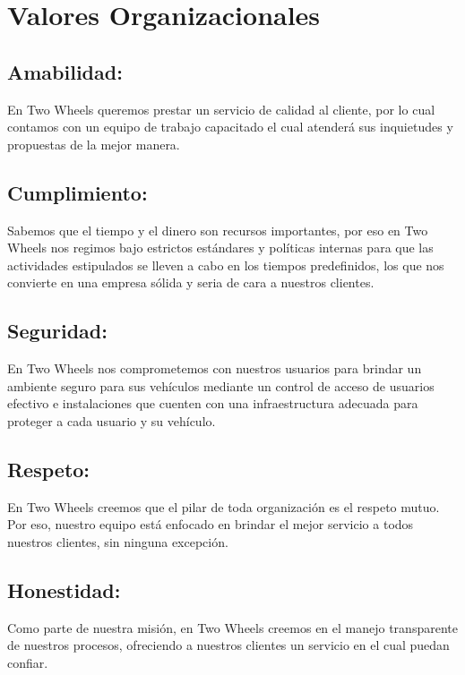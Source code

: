 \section{Valores Organizacionales}
\subsection{Amabilidad:}  En Two Wheels queremos prestar un servicio de calidad al cliente, por lo cual contamos con un equipo de trabajo capacitado el cual atenderá sus inquietudes y propuestas de la mejor manera.
\subsection{Cumplimiento:}
Sabemos que el tiempo y el dinero son recursos importantes, por eso en Two Wheels nos regimos bajo estrictos estándares y políticas internas para que las actividades estipulados se lleven a cabo en los tiempos predefinidos, los que nos convierte en una empresa sólida y seria de cara a nuestros clientes.
\subsection{Seguridad:}
En Two Wheels nos comprometemos con nuestros usuarios para brindar un ambiente seguro para sus vehículos mediante un control de acceso de usuarios efectivo e instalaciones que cuenten con una infraestructura adecuada para proteger a cada usuario y su vehículo.
\subsection{Respeto:}
En Two Wheels creemos que el pilar de toda organización es el respeto mutuo. Por eso, nuestro equipo está enfocado en brindar el mejor servicio a todos nuestros clientes, sin ninguna excepción.
\subsection{Honestidad:}
Como parte de nuestra misión, en Two Wheels creemos en el manejo transparente de nuestros procesos, ofreciendo a nuestros clientes un servicio en el cual puedan confiar.

